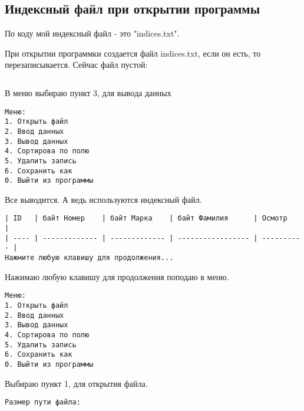 \subsection{Индексный файл при открытии программы}

По коду мой индексный файл - это "indices.txt".

При открытии программки создается файл indices.txt, если он есть, то перезаписывается. Сейчас файл пустой:

\begin{tcolorbox}
\begin{verbatim}

\end{verbatim}
\end{tcolorbox}

В меню выбираю пункт 3, для вывода данных

\begin{tcolorbox}
\begin{verbatim}
Меню:
1. Открыть файл
2. Ввод данных       
3. Вывод данных      
4. Сортирова по полю 
5. Удалить запись    
6. Сохранить как     
0. Выйти из программы
\end{verbatim}
\end{tcolorbox}

Все выводится. А ведь используются индексный файл.

\begin{tcolorbox}
\begin{verbatim}
| ID   | байт Номер    | байт Марка    | байт Фамилия      | Осмотр     | 
| ---- | ------------- | ------------- | ----------------- | ---------- | 
Нажмите любую клавишу для продолжения...
\end{verbatim}
\end{tcolorbox}

Нажимаю любую клавишу для продолжения поподаю в меню.

\begin{tcolorbox}
\begin{verbatim}
Меню:
1. Открыть файл
2. Ввод данных       
3. Вывод данных      
4. Сортирова по полю 
5. Удалить запись    
6. Сохранить как     
0. Выйти из программы
\end{verbatim}
\end{tcolorbox}

Выбираю пункт 1, для открытия файла.

\begin{tcolorbox}
\begin{verbatim}
Размер пути файла: 
\end{verbatim}
\end{tcolorbox}

